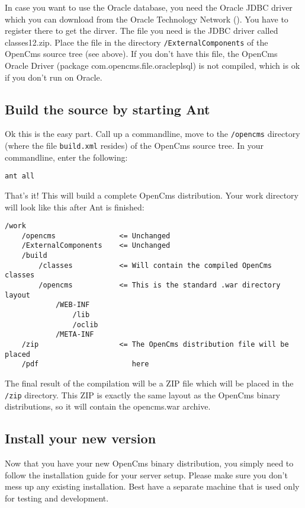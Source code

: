 In case you want to use the Oracle database, you need the Oracle JDBC driver
which you can download from the Oracle Technology Network 
(). You have to register 
there to get the dirver. The file 
you need is the JDBC driver called classes12.zip. Place the file in the 
directory \texttt{/ExternalComponents} of the OpenCms source tree (see above). If you 
don't have this file, the OpenCms Oracle Driver 
(package com.opencms.file.oracleplsql) is not compiled, which is ok if you 
don't run on Oracle.

\subsection{Build the source by starting Ant}

Ok this is the easy part. Call up a commandline, move to the \texttt{/opencms} 
directory (where the file \texttt{build.xml} resides) of the OpenCms source tree. 
In your commandline, enter the following: 

\texttt{ant all} 

That's it! This will build a complete OpenCms distribution. Your work 
directory will look like this after Ant is finished: 

\begin{verbatim}
/work
    /opencms               <= Unchanged
    /ExternalComponents    <= Unchanged
    /build
        /classes           <= Will contain the compiled OpenCms classes
        /opencms           <= This is the standard .war directory layout
            /WEB-INF
                /lib
                /oclib
            /META-INF
    /zip                   <= The OpenCms distribution file will be placed
    /pdf                      here
\end{verbatim}


The final result of the compilation will be a ZIP file which will be placed 
in the \texttt{/zip} directory. This ZIP is exactly the same layout as the OpenCms
binary distributions, so it will contain the opencms.war archive. 

\subsection{Install your new version}

Now that you have your new OpenCms binary distribution, you simply need to 
follow the installation guide for your server setup. Please make sure you 
don't mess up any existing installation. Best have a separate machine that 
is used only for testing and development. 

